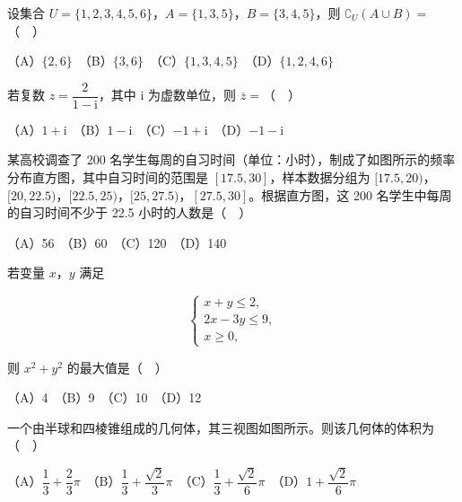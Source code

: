 \begin{question}
设集合 \(U=\{1,2,3,4,5,6\}\)，\(A=\{1,3,5\}\)，\(B=\{3,4,5\}\)，则 \(\complement_U(A\cup B)=\)（　）

（A）\(\{2,6\}\)　（B）\(\{3,6\}\)　（C）\(\{1,3,4,5\}\)　（D）\(\{1,2,4,6\}\)

\end{question}
\begin{question}
若复数 \(z=\dfrac{2}{1-\mathrm{i}}\)，其中 \(\mathrm{i}\) 为虚数单位，则 \(\overline{z}=\)（　）

（A）\(1+\mathrm{i}\)　（B）\(1-\mathrm{i}\)　（C）\(-1+\mathrm{i}\)　（D）\(-1-\mathrm{i}\)

\Needspace{0.4\textheight}
\end{question}
\begin{question}
某高校调查了 200 名学生每周的自习时间（单位：小时），制成了如图所示的频率分布直方图，其中自习时间的范围是 \([17.5,30]\)，样本数据分组为 \([17.5,20)\)，\([20,22.5)\)，\([22.5,25)\)，\([25,27.5)\)，\([27.5,30]\)。根据直方图，这 200 名学生中每周的自习时间不少于 22.5 小时的人数是（　）
\nopagebreak[4]
\begin{center}\end{center}
\nopagebreak[4]
（A）56　（B）60　（C）120　（D）140

\end{question}
\begin{question}
若变量 \(x\)，\(y\) 满足

\nopagebreak[4]
\[
\begin{cases}
x+y\leqslant 2,\\
2x-3y\leqslant 9,\\
x\geqslant 0,
\end{cases}
\]

则 \(x^2+y^2\) 的最大值是（　）

（A）4　（B）9　（C）10　（D）12

\Needspace{0.4\textheight}
\end{question}
\begin{question}
一个由半球和四棱锥组成的几何体，其三视图如图所示。则该几何体的体积为（　）
\nopagebreak[4]
\begin{center}\end{center}
\nopagebreak[4]
（A）\(\dfrac{1}{3}+\dfrac{2}{3}\pi\)　（B）\(\dfrac{1}{3}+\dfrac{\sqrt{2}}{3}\pi\)　（C）\(\dfrac{1}{3}+\dfrac{\sqrt{2}}{6}\pi\)　（D）\(1+\dfrac{\sqrt{2}}{6}\pi\)

\end{question}
